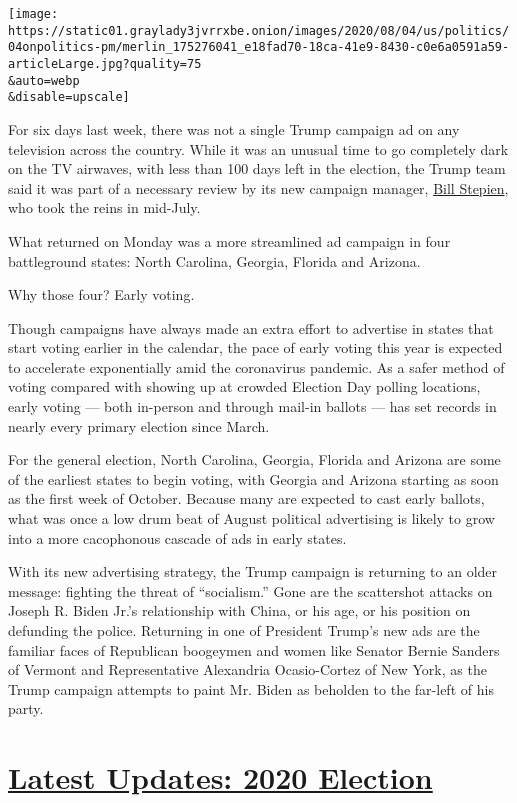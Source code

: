 \texttt{[image: https://static01.graylady3jvrrxbe.onion/images/2020/08/04/us/politics/04onpolitics-pm/merlin\_175276041\_e18fad70-18ca-41e9-8430-c0e6a0591a59-articleLarge.jpg?quality=75\\\&auto=webp\\\&disable=upscale]}

For six days last week, there was not a single Trump campaign ad on any
television across the country. While it was an unusual time to go
completely dark on the TV airwaves, with less than 100 days left in the
election, the Trump team said it was part of a necessary review by its
new campaign manager,
\href{https://www.nytimes3xbfgragh.onion/article/bill-stepien.html}{Bill
Stepien}, who took the reins in mid-July.

What returned on Monday was a more streamlined ad campaign in four
battleground states: North Carolina, Georgia, Florida and Arizona.

Why those four? Early voting.

Though campaigns have always made an extra effort to advertise in states
that start voting earlier in the calendar, the pace of early voting this
year is expected to accelerate exponentially amid the coronavirus
pandemic. As a safer method of voting compared with showing up at
crowded Election Day polling locations, early voting --- both in-person
and through mail-in ballots --- has set records in nearly every primary
election since March.

For the general election, North Carolina, Georgia, Florida and Arizona
are some of the earliest states to begin voting, with Georgia and
Arizona starting as soon as the first week of October. Because many are
expected to cast early ballots, what was once a low drum beat of August
political advertising is likely to grow into a more cacophonous cascade
of ads in early states.

With its new advertising strategy, the Trump campaign is returning to an
older message: fighting the threat of ``socialism.'' Gone are the
scattershot attacks on Joseph R. Biden Jr.'s relationship with China, or
his age, or his position on defunding the police. Returning in one of
President Trump's new ads are the familiar faces of Republican boogeymen
and women like Senator Bernie Sanders of Vermont and Representative
Alexandria Ocasio-Cortez of New York, as the Trump campaign attempts to
paint Mr. Biden as beholden to the far-left of his party.

\hypertarget{latest-updates-2020-election}{%
\section{\texorpdfstring{\href{https://www.nytimes3xbfgragh.onion/2020/08/04/us/elections/primary-election-michigan-arizona-kansas.html?action=click\&pgtype=Article\&state=default\&region=MAIN_CONTENT_1\&context=storylines_live_updates}{Latest
Updates: 2020
Election}}{Latest Updates: 2020 Election}}\label{latest-updates-2020-election}}

